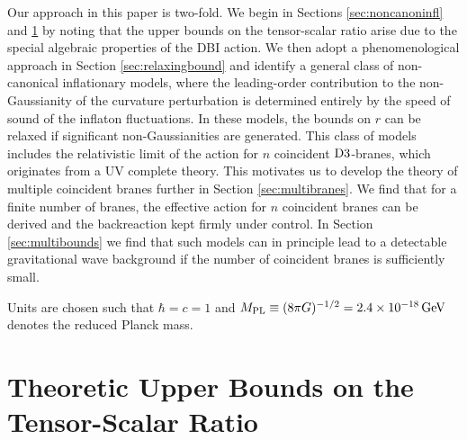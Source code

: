 Our approach in this paper is two-fold. We 
begin in Sections \ref{sec:noncanoninfl} and \ref{sec:theobound} 
by noting that the upper bounds on the tensor-scalar ratio arise due to the
special algebraic properties of the DBI action. We 
then adopt a phenomenological approach in Section \ref{sec:relaxingbound}
and identify a general class of non-canonical inflationary models, 
where the leading-order contribution to the non-Gaussianity of the 
curvature perturbation is determined 
entirely by the speed of sound of the inflaton fluctuations. 
In these models, the bounds on $r$ can be relaxed 
if significant non-Gaussianities are generated.  
This class of models includes the relativistic limit  
of the action for $n$ coincident ${\rm D3}$-branes, 
which originates from a UV complete theory. This motivates us 
to develop the theory of multiple coincident branes further in Section
\ref{sec:multibranes}. We find that for a finite number of branes, 
the effective action for $n$ coincident branes can be derived and the backreaction
kept firmly under control.
In Section \ref{sec:multibounds} we find that such models 
can in principle lead to a detectable 
gravitational wave background if 
the number of coincident branes is sufficiently small. 

Units are chosen such that $\hbar = c =1$ and $M_{\mathrm{PL}} \equiv (8\pi G)^{-1/2}
= 2.4 \times 10^{-18} \, {\rm GeV}$ denotes the 
reduced Planck mass. 


% 
% 
\section{Theoretic Upper Bounds on the Tensor-Scalar Ratio}
\label{sec:theobound}

